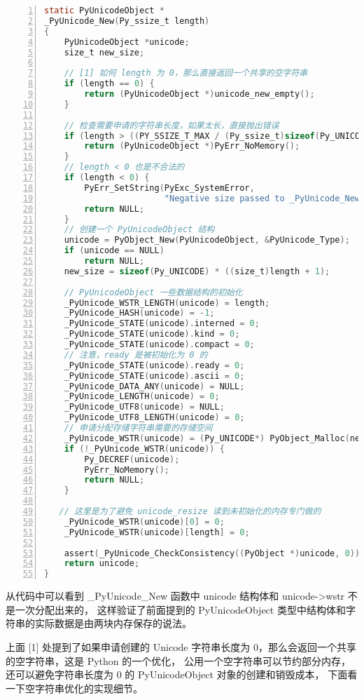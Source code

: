 \begin{lstlisting}[language=C, numbers=left, numbersep=1em, numberstyle=\footnotesize , breaklines=true]
static PyUnicodeObject *
_PyUnicode_New(Py_ssize_t length)
{
    PyUnicodeObject *unicode;
    size_t new_size;

    // [1] 如何 length 为 0，那么直接返回一个共享的空字符串
    if (length == 0) {
        return (PyUnicodeObject *)unicode_new_empty();
    }

    // 检查需要申请的字符串长度，如果太长，直接抛出错误
    if (length > ((PY_SSIZE_T_MAX / (Py_ssize_t)sizeof(Py_UNICODE)) - 1)) {
        return (PyUnicodeObject *)PyErr_NoMemory();
    }
    // length < 0 也是不合法的
    if (length < 0) {
        PyErr_SetString(PyExc_SystemError,
                        "Negative size passed to _PyUnicode_New");
        return NULL;
    }
    // 创建一个 PyUnicodeObject 结构
    unicode = PyObject_New(PyUnicodeObject, &PyUnicode_Type);
    if (unicode == NULL)
        return NULL;
    new_size = sizeof(Py_UNICODE) * ((size_t)length + 1);

    // PyUnicodeObject 一些数据结构的初始化
    _PyUnicode_WSTR_LENGTH(unicode) = length;
    _PyUnicode_HASH(unicode) = -1;
    _PyUnicode_STATE(unicode).interned = 0;
    _PyUnicode_STATE(unicode).kind = 0;
    _PyUnicode_STATE(unicode).compact = 0;
    // 注意，ready 是被初始化为 0 的
    _PyUnicode_STATE(unicode).ready = 0;
    _PyUnicode_STATE(unicode).ascii = 0;
    _PyUnicode_DATA_ANY(unicode) = NULL;
    _PyUnicode_LENGTH(unicode) = 0;
    _PyUnicode_UTF8(unicode) = NULL;
    _PyUnicode_UTF8_LENGTH(unicode) = 0;
    // 申请分配存储字符串需要的存储空间
    _PyUnicode_WSTR(unicode) = (Py_UNICODE*) PyObject_Malloc(new_size);
    if (!_PyUnicode_WSTR(unicode)) {
        Py_DECREF(unicode);
        PyErr_NoMemory();
        return NULL;
    }

   // 这里是为了避免 unicode_resize 读到未初始化的内存专门做的
    _PyUnicode_WSTR(unicode)[0] = 0;
    _PyUnicode_WSTR(unicode)[length] = 0;

    assert(_PyUnicode_CheckConsistency((PyObject *)unicode, 0));
    return unicode;
}
\end{lstlisting}

从代码中可以看到 \_PyUnicode\_New 函数中 unicode 结构体和 unicode->wstr 不是一次分配出来的，
这样验证了前面提到的 PyUnicodeObject 类型中结构体和字符串的实际数据是由两块内存保存的说法。

上面 [1] 处提到了如果申请创建的 Unicode 字符串长度为 0，那么会返回一个共享的空字符串，这是 Python 的一个优化，
公用一个空字符串可以节约部分内存，还可以避免字符串长度为 0 的 PyUnicodeObject 对象的创建和销毁成本，
下面看一下空字符串优化的实现细节。

